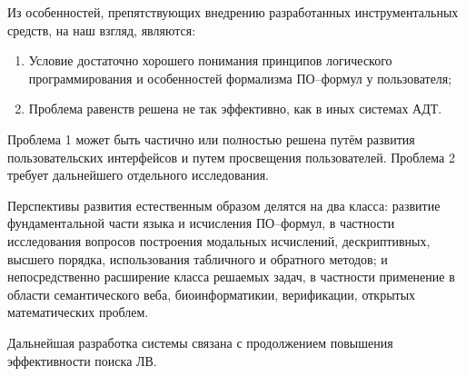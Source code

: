 

Из особенностей, препятствующих внедрению разработанных инструментальных средств, на наш взгляд, являются:

\begin{enumerate}
\item Условие достаточно хорошего понимания принципов логического программирования и особенностей формализма ПО--формул у пользователя;
\item Проблема равенств решена не так эффективно, как в иных системах АДТ.
\end{enumerate}

Проблема 1 может быть частично или полностью решена путём развития пользовательских интерфейсов и путем просвещения пользователей. Проблема 2 требует дальнейшего отдельного исследования.


Перспективы развития естественным образом делятся на два класса: развитие фундаментальной части языка и исчисления ПО--формул, в частности исследования вопросов построения модальных исчислений, дескриптивных, высшего порядка, использования табличного и обратного методов; и непосредственно расширение класса решаемых задач, в частности применение в области семантического веба, биоинформатикии, верификации, открытых математических проблем. 

Дальнейшая разработка системы связана с продолжением повышения эффективности поиска ЛВ.


